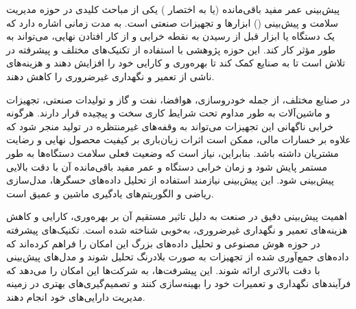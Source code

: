 

پیش‌بینی عمر مفید باقی‌مانده (یا به اختصار ) یکی از مباحث کلیدی در حوزه مدیریت سلامت و پیش‌بینی () ابزارها و تجهیزات صنعتی است.  به مدت زمانی اشاره دارد که یک دستگاه یا ابزار قبل از رسیدن به نقطه خرابی و از کار افتادن نهایی، می‌تواند به طور مؤثر کار کند. این حوزه پژوهشی با استفاده از تکنیک‌های مختلف و پیشرفته در تلاش است تا به صنایع کمک کند تا بهره‌وری و کارایی خود را افزایش دهند و هزینه‌های ناشی از تعمیر و نگهداری غیرضروری را کاهش دهند.








در صنایع مختلف، از جمله خودروسازی، هوافضا، نفت و گاز و تولیدات صنعتی، تجهیزات و ماشین‌آلات به طور مداوم تحت شرایط کاری سخت و پیچیده قرار دارند. هرگونه خرابی ناگهانی این تجهیزات می‌تواند به وقفه‌های غیرمنتظره در تولید منجر شود که علاوه بر خسارات مالی، ممکن است اثرات زیان‌باری بر کیفیت محصول نهایی و رضایت مشتریان داشته باشد. بنابراین، نیاز است که وضعیت فعلی سلامت دستگاه‌ها به طور مستمر پایش شود و زمان خرابی دستگاه و عمر مفید باقی‌مانده آن با دقت بالایی پیش‌بینی شود. این پیش‌بینی نیازمند استفاده از تحلیل داده‌های حسگرها، مدل‌سازی ریاضی و الگوریتم‌های یادگیری ماشین و عمیق است.







اهمیت پیش‌بینی دقیق  در صنعت به دلیل تاثیر مستقیم آن بر بهره‌وری، کارایی و کاهش هزینه‌های تعمیر و نگهداری غیرضروری، به‌خوبی شناخته شده است. تکنیک‌های پیشرفته در حوزه هوش مصنوعی و تحلیل داده‌های بزرگ این امکان را فراهم کرده‌اند که داده‌های جمع‌آوری شده از تجهیزات به صورت بلادرنگ تحلیل شوند و مدل‌های پیش‌بینی  با دقت بالاتری ارائه شوند. این پیشرفت‌ها، به شرکت‌ها این امکان را می‌دهد که فرآیندهای نگهداری و تعمیرات خود را بهینه‌سازی کنند و تصمیم‌گیری‌های بهتری در زمینه مدیریت دارایی‌های خود انجام دهند.




%
%


